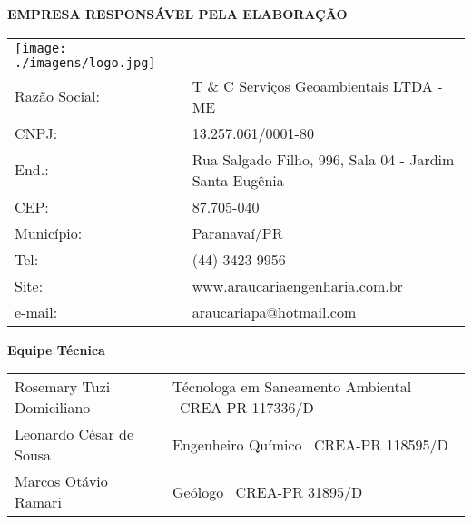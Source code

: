 \textbf{EMPRESA RESPONSÁVEL PELA ELABORAÇÃO}\\


\begin{tabular}{p{4cm} p{11cm}}
	\texttt{[image: ./imagens/logo.jpg]}&\\
	Razão Social: & T \& C Serviços Geoambientais LTDA - 
	ME\\
	CNPJ: & 13.257.061/0001-80\\ %
	End.: & Rua Salgado Filho, 996, Sala 04 - Jardim Santa 
	Eugênia\\
	CEP: & 87.705-040\\
	Município: & Paranavaí/PR  \\
	Tel: & (44) 3423 9956  \\
	Site: &  www.araucariaengenharia.com.br\\
	e-mail: & araucariapa@hotmail.com \\
\end{tabular}
\vfill

\textbf{Equipe Técnica}\\


\begin{tabular}{p{6cm} p{8cm}}
	
	Rosemary Tuzi Domiciliano & Técnologa em Saneamento 
	Ambiental \textendash~CREA-PR 117336/D\\
	Leonardo César de Sousa & Engenheiro Químico 
	\textendash~CREA-PR 118595/D \\
	Marcos Otávio Ramari & Geólogo \textendash~CREA-PR 
	31895/D\\
\end{tabular}






\vfill
\thispagestyle{empty}


\restoregeometry

\fancyhead[LE,RO]{\thepage}
